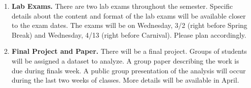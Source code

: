 \documentclass[11pt]{article}
\begin{document}
\begin{enumerate}




\item {\bf Lab Exams.} There are two lab exams throughout the semester.  Specific details about the content and format of the lab exams will be available closer to the exam dates.  The exams will be on Wednesday, 3/2 (right before Spring Break) and Wednesday, 4/13 (right before Carnival).  Please plan accordingly.


\item {\bf Final Project and Paper.} There will be a final project.  Groups of students will be assigned a dataset to analyze.  A group paper describing the work is due during finals week.  A public group presentation of the analysis will occur during the last two weeks of classes.  More details will be available in April.



\end{enumerate}
\end{document}
